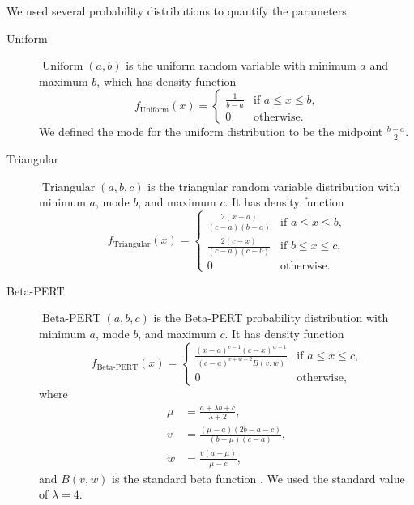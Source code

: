\documentclass{article}
\DeclareMathOperator{\Uniform}{Uniform}
\DeclareMathOperator{\Triangular}{Triangular}
\DeclareMathOperator{\BetaPERT}{Beta-PERT}
\begin{document}
We used several probability distributions to quantify the parameters.
\begin{description}
\item[Uniform] $\Uniform(a, b)$ is the uniform random variable with
  minimum $a$ and maximum $b$, which has density function
  \begin{equation}
    \label{uniform}
    f_{\Uniform}(x) =
    \begin{cases}
      \frac{1}{b - a} & \text{if $a \leq x \leq b$,}
      \\
      0 & \text{otherwise.}
    \end{cases}
  \end{equation}
  We defined the mode for the uniform distribution to be the midpoint
  $\frac{b - a}{2}$.

\item [Triangular] $\Triangular(a, b, c)$ is the triangular random
  variable distribution with minimum $a$, mode $b$, and maximum $c$.
  It has density function
  \begin{equation}
    \label{triangular}
    f_{\Triangular}(x) =
    \begin{cases}
      \frac{2 (x - a)}{(c - a)(b - a)} & \text{if $a \leq x \leq b$,}
      \\
      \frac{2 (c - x)}{(c - a)(c - b)} & \text{if $b \leq x \leq c$,}
      \\
      0 & \text{otherwise.}
    \end{cases}
  \end{equation}

\item[Beta-PERT] $\BetaPERT(a, b, c)$ is the Beta-PERT probability
  distribution \cite{malcom1959} with minimum $a$, mode $b$, and
  maximum $c$.  It has density function
  \begin{equation}
    \label{BetaPERT}
    f_{\BetaPERT}(x) =
    \begin{cases}
      \frac{(x - a)^{v - 1} (c - x)^{w - 1}}{(c - a)^{v + w - 2} B(v, w)}
      & \text{if $a \leq x \leq c$,}
      \\
      0 & \text{otherwise,}
    \end{cases}
  \end{equation}
  where
  \begin{equation}
    \begin{split}
      \mu &= \frac{a + \lambda b + c}{\lambda + 2},
      \\
      v &= \frac{(\mu - a)(2 b - a - c)}{(b - \mu) (c - a)},
      \\
      w &= \frac{v (a - \mu)}{\mu - c},
    \end{split}
  \end{equation}
  and $B(v, w)$ is the standard beta function \cite[\S 6.2]{davis1972}.
  We used the standard value of $\lambda = 4$.


\end{description}
\end{document}
